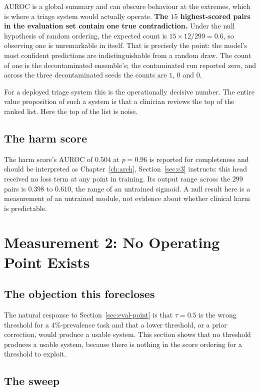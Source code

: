 AUROC is a global summary and can obscure behaviour at the extremes, which is
where a triage system would actually operate. \textbf{The $15$ highest-scored
pairs in the evaluation set contain one true contradiction.} Under the null
hypothesis of random ordering, the expected count is $15 \times 12/299 = 0.6$,
so observing one is unremarkable in itself. That is precisely the point: the
model's most confident predictions are indistinguishable from a random draw. The
count of one is the decontaminated ensemble's; the contaminated run reported
zero, and across the three decontaminated seeds the counts are $1$, $0$ and $0$.

For a deployed triage system this is the operationally decisive number. The
entire value proposition of such a system is that a clinician reviews the top of
the ranked list. Here the top of the list is noise.

\subsection{The harm score}

The harm score's AUROC of $0.504$ at $p = 0.96$ is reported for completeness and
should be interpreted as Chapter~\ref{ch:arch}, Section~\ref{sec:c3} instructs:
this head received no loss term at any point in training. Its output range
across the $299$ pairs is $0.398$ to $0.610$, the range of an untrained sigmoid.
A null result here is a measurement of an untrained module, not evidence about
whether clinical harm is predictable.

\section{Measurement 2: No Operating Point Exists}
\label{sec:m2}

\subsection{The objection this forecloses}

The natural response to Section~\ref{sec:eval-point} is that $\tau = 0.5$ is the
wrong threshold for a $4\%$-prevalence task and that a lower threshold, or a
prior correction, would produce a usable system. This section shows that no
threshold produces a usable system, because there is nothing in the score
ordering for a threshold to exploit.

\subsection{The sweep}

